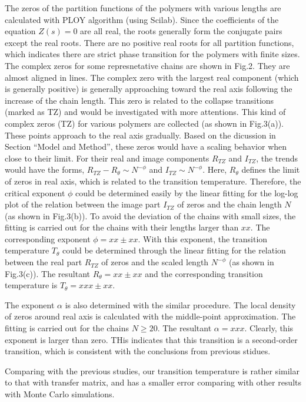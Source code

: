 \documentclass[preprint,preprintnumbers,amsmath,amssymb,showpacs,aps,pre]{revtex4-1}
\begin{document}
The zeros of the partition functions of the polymers with various lengths are
calculated with PLOY algorithm (using Scilab). Since the coefficients of the
equation $Z(s)=0$ are all real, the roots generally form the conjugate pairs
except the real roots. There are no positive real roots for all partition
functions, which indicates there are strict phase transition for the polymers
with finite sizes. The complex zeros for some represnetative chains are shown
in Fig.2. They are almost aligned in lines. The complex zero with the largest
real component (which is generally positive) is generally approaching toward
the real axis following the increase of the chain length. This zero is related
to the collapse transitions (marked as TZ) and would be investigated with more
attentions. This kind of complex zeros (TZ) for various polymers are collected
(as shown in Fig.3(a)). These points approach to the real axis gradually.
Based on the dicussion in Section ``Model and Method'', these zeros would
have a scaling behavior when close to their limit. For their real and image
components $R_{TZ}$ and $I_{TZ}$, the trends would have the forms,
$R_{TZ}-R_{\theta} \sim N^{-\phi}$ and $I_{TZ} \sim N^{-\phi}$. Here,
$R_{\theta}$ defines the limit of zeros in real axis, which is related to the
transition temperature. Therefore, the critical exponent $\phi$ could be
determined easily by the linear fitting for the log-log plot of the relation
between the image part $I_{TZ}$ of zeros and the chain length $N$ (as shown in
Fig.3(b)). To avoid the deviation of the chains with small sizes, the fitting
is carried out for the chains with their lengths larger than $xx$. The
corresponding exponent $\phi=xx \pm xx$. With this exponent, the transition
temperature $T_{\theta}$ could be determined through the linear fitting for
the relation between the real part $R_{TZ}$ of zeros and the scaled length
$N^{-\phi}$ (as shown in Fig.3(c)). The resultant $R_{\theta}=xx \pm xx$ and
the corresponding transition temperature is $T_{\theta}=xxx \pm xx$.

The exponent $\alpha$ is also determined with the similar procedure. The local
density of zeros around real axis is calculated with the middle-point
approximation. The fitting is carried out for the chains $N\ge 20$. The
resultant $\alpha=xxx$. Clearly, this exponent is larger than zero. THis
indicates that this transition is a second-order transition, which is
consistent with the conclusions from previous stidues.

Comparing with the previous studies, our transition temperature is rather
similar to that with transfer matrix, and has a smaller error comparing with
other results with Monte Carlo simulations. 
\end{document}
